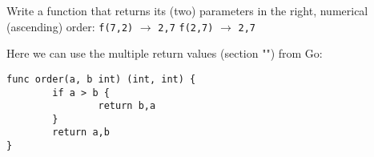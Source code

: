 \begin{Exercise}[title={Integer ordering},difficulty=3]
\label{ex:ordering function}
\Question Write a function that returns its (two) parameters in the right,
numerical (ascending) order:\newline 
\lstinline{f(7,2)} $\rightarrow$ \lstinline{2,7}\newline
\lstinline{f(2,7)} $\rightarrow$ \lstinline{2,7}\newline
\end{Exercise}

\begin{Answer}
\Question 
Here we can use the multiple return values (section "")
from Go:
\begin{lstlisting}
func order(a, b int) (int, int) {
        if a > b { 
                return b,a 
        }   
        return a,b 
}
\end{lstlisting}

\end{Answer}
